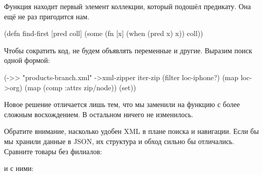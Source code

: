Функция  находит первый элемент коллекции, который подошёл
предикату. Она ещё не раз пригодится нам.

\begin{english}
  \begin{clojure}
(defn find-first [pred coll]
  (some (fn [x]
          (when (pred x)
            x))
        coll))
  \end{clojure}
\end{english}

Чтобы сократить код, не будем объявлять переменные  и
другие. Выразим поиск одной формой:

\begin{english}
  \begin{clojure}
(->> "products-branch.xml"
     ->xml-zipper
     iter-zip
     (filter loc-iphone?)
     (map loc->org)
     (map (comp :attrs zip/node))
     (set))
  \end{clojure}
\end{english}

Новое решение отличается лишь тем, что мы заменили  на функцию с более
сложным восхождением. В остальном ничего не изменилось.

Обратите внимание, насколько удобен XML в плане поиска и навигации. Если бы мы
хранили данные в JSON, их структура и обход сильно бы отличались. Сравните
товары без филиалов:

\begin{english}
  \begin{json}
  \end{json}
\end{english}

и с ними:

\begin{english}
  \begin{json}
  \end{json}
\end{english}

